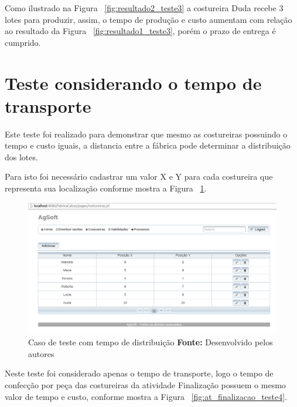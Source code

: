 \par Como ilustrado na Figura ~\ref{fig:resultado2_teste3} a costureira Duda
recebe 3 lotes para produzir, assim, o tempo de produção e custo aumentam com
relação ao resultado da Figura ~\ref{fig:resultado1_teste3}, porém o prazo de
entrega é cumprido.


\section{Teste considerando o tempo de transporte}

\par Este teste foi realizado para demonstrar que mesmo as costureiras possuindo
o tempo e custo iguais, a distancia entre a fábrica pode determinar a
distribuição dos lotes.


\par Para isto foi necessário cadastrar um valor X e Y para cada costureira que
representa sua localização conforme mostra a Figura ~\ref{fig:add_xy_costureira_teste4}.

\newpage

\begin{figure}[h!]
	\centerline{\includegraphics[scale=0.3]{./imagens/posicao_xy_costureiras_teste4.png}}
	\caption[Caso de teste com tempo de distribuição]
	{Caso de teste com tempo de distribuição \textbf{Fonte:} Desenvolvido pelos autores}
	\label{fig:add_xy_costureira_teste4}
\end{figure}



\par Neste teste foi considerado apenas o tempo de transporte, logo o tempo de
confecção por peça das costureiras da atividade Finalização possuem o mesmo
valor de tempo e custo, conforme mostra a Figura
~\ref{fig:at_finalizacao_teste4}.


